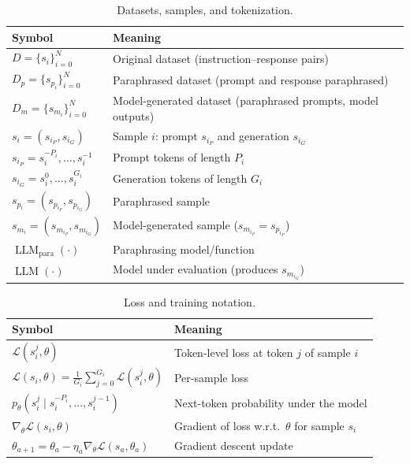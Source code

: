 \begin{table}[H]
    \centering
    \small
    \begin{tabular}{ll}
        \textbf{Symbol} & \textbf{Meaning} \\
        \hline
        $D=\{s_i\}_{i=0}^{N}$ & Original dataset (instruction–response pairs) \\
        $D_p=\{s_{p_i}\}_{i=0}^{N}$ & Paraphrased dataset (prompt and response paraphrased) \\
        $D_m=\{s_{m_i}\}_{i=0}^{N}$ & Model-generated dataset (paraphrased prompts, model outputs) \\
        $s_i=(s_{i_P}, s_{i_G})$ & Sample $i$: prompt $s_{i_P}$ and generation $s_{i_G}$ \\
        $s_{i_P}=s_i^{-P_i},\dots,s_i^{-1}$ & Prompt tokens of length $P_i$ \\
        $s_{i_G}=s_i^{0},\dots,s_i^{G_i}$ & Generation tokens of length $G_i$ \\
        $s_{p_i}=(s_{p_{i_P}}, s_{p_{i_G}})$ & Paraphrased sample \\
        $s_{m_i}=(s_{m_{i_P}}, s_{m_{i_G}})$ & Model-generated sample ($s_{m_{i_P}}=s_{p_{i_P}}$) \\
        $\operatorname{LLM}_{\text{para}}(\cdot)$ & Paraphrasing model/function \\
        $\operatorname{LLM}(\cdot)$ & Model under evaluation (produces $s_{m_{i_G}}$) \\
    \end{tabular}
    \caption{Datasets, samples, and tokenization.}
    \label{tab:nomenclature-data}
\end{table}

\begin{table}[H]
    \centering
    \small
    \begin{tabular}{ll}
        \textbf{Symbol} & \textbf{Meaning} \\
        \hline
        $\mathcal{L}(s_i^j,\theta)$ & Token-level loss at token $j$ of sample $i$ \\
        $\mathcal{L}(s_i,\theta)=\frac{1}{G_i}\sum_{j=0}^{G_i}\mathcal{L}(s_i^j,\theta)$ & Per-sample loss \\
        $p_\theta(s_i^j \mid s_i^{-P_i},\dots,s_i^{j-1})$ & Next-token probability under the model \\
        $\nabla_{\theta}\mathcal{L}(s_i,\theta)$ & Gradient of loss w.r.t.\ $\theta$ for sample $s_i$ \\
        $\theta_{a+1}=\theta_a-\eta_a\nabla_{\theta}\mathcal{L}(s_a,\theta_a)$ & Gradient descent update \\
    \end{tabular}
    \caption{Loss and training notation.}
    \label{tab:nomenclature-loss}
\end{table}

